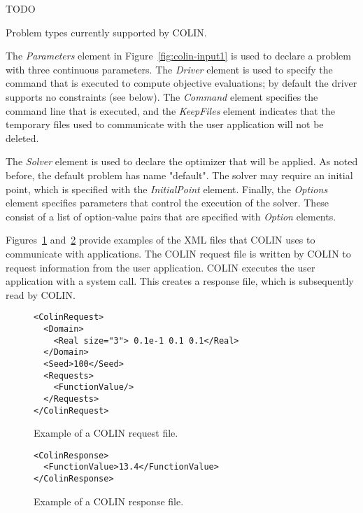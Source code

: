 \begin{table}[htbp]
TODO
\caption{Problem types currently supported by COLIN.\label{table:types}}
\end{table}

The \emph{Parameters} element in Figure~\ref{fig:colin-input1} is used to declare a problem with three continuous parameters.  The \emph{Driver} element is used to specify the command that is executed to compute objective evaluations; by default the driver supports no constraints (see below).  The \emph{Command} element specifies the command line that is executed, and the \emph{KeepFiles} element indicates that the temporary files used to communicate with the user application will not be deleted.

The \emph{Solver} element is used to declare the optimizer that will be applied.  As noted before, the default problem has name "default".  The solver may require an initial point, which is specified with the \emph{InitialPoint} element.  Finally, the \emph{Options} element specifies parameters that control the execution of the solver.  These consist of a list of option-value pairs that are specified with \emph{Option} elements.

Figures~\ref{fig:request} and~\ref{fig:response} provide examples of the XML files that COLIN uses to communicate with applications.  The COLIN request file is written by COLIN to request information from the user application.  COLIN executes the user application with a system call.  This creates a response file, which is subsequently read by COLIN.

\begin{figure}[htb]
\begin{lstlisting}
<ColinRequest>
  <Domain>
    <Real size="3"> 0.1e-1 0.1 0.1</Real>
  </Domain>
  <Seed>100</Seed>
  <Requests>
    <FunctionValue/>
  </Requests>
</ColinRequest>
\end{lstlisting}
\caption{Example of a COLIN request file.\label{fig:request}}
\end{figure}

\begin{figure}[htb]
\begin{lstlisting}
<ColinResponse>
  <FunctionValue>13.4</FunctionValue>
</ColinResponse>
\end{lstlisting}
\caption{Example of a COLIN response file.\label{fig:response}}
\end{figure}